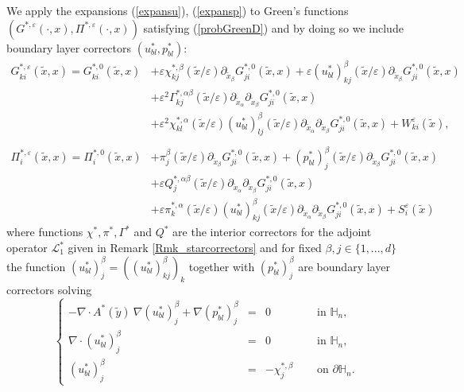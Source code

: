 \documentclass[11pt, reqno]{amsart}
\theoremstyle{definition}
\theoremstyle{remark}
\numberwithin{equation}{section}
\begin{document}
	\noindent We apply the expansions (\ref{expansu}), (\ref{expansp}) to Green's functions $(G^{*,\varepsilon}(\cdot, x),\Pi^{*,\varepsilon}(\cdot, x))$  satisfying (\ref{probGreenD}) and by doing so we include boundary layer correctors $(u_{bl}^*,p_{bl}^*):$
	\begin{align}
		G_{ki}^{*,\varepsilon} (\tilde{x},x)= G_{ki}^{*,0} (\tilde{x},x)&+ \varepsilon	\chi^{*,\beta}_{kj}(\tilde{x}/\varepsilon)\partial_{\tilde{x}_{\beta}} G_{ji}^{*,0}  (\tilde{x},x) + \varepsilon	(u_{bl}^*)^{\beta}_{kj}(\tilde{x}/\varepsilon)\partial_{\tilde{x}_{\beta}} G_{ji}^{*,0}  (\tilde{x},x)	\nonumber\\
		& + \varepsilon^2 \Gamma^{*,\alpha\beta}_{kj}(\tilde{x}/\varepsilon) \partial_{\tilde{x}_{\alpha}}\partial_{\tilde{x}_\beta} G_{ji}^{*,0}  (\tilde{x},x)\nonumber\\&+ \varepsilon^2	\chi^{*,\alpha}_{kl}(\tilde{x}/\varepsilon)(u_{bl}^*)^{\beta}_{lj}	(\tilde{x}/\varepsilon)  \partial_{\tilde{x}_{\alpha}}\partial_{\tilde{x}_\beta}G_{ji}^{*,0}  (\tilde{x},x)+	W_{ki}^{\varepsilon} (\tilde{x}),\label{expansG}	\\\nonumber\\
		\Pi_i^{*,\varepsilon} (\tilde{x},x)=  \Pi_i^{*,0} (\tilde{x},x)&+	\pi^{\beta}_{j}(\tilde{x}/\varepsilon)\partial_{\tilde{x}_\beta} G_{ji}^{*,0}   (\tilde{x},x)	 + (p_{bl}^*)^{\beta}_{j}(\tilde{x}/\varepsilon)  \partial_{\tilde{x}_\beta}G_{ji}^{*,0}  (\tilde{x},x)\nonumber\\
		&	+ \varepsilon Q^{*,\alpha\beta}_{j}(\tilde{x}/\varepsilon) \partial_{\tilde{x}_{\alpha}}\partial_{\tilde{x}_\beta}G_{ji}^{*,0}  (\tilde{x},x)\nonumber\\& +  \varepsilon	\pi^{*,\alpha}_{k}(\tilde{x}/\varepsilon)	(u^*_{bl})^{\beta}_{kj}(\tilde{x}/\varepsilon)\partial_{\tilde{x}_{\alpha}}\partial_{\tilde{x}_\beta} G_{ji}^{*,0} (\tilde{x},x)+	S_{i}^{\varepsilon} (\tilde{x})\label{expansPi}
	\end{align}	
	where functions $\chi^*, \pi^*, \Gamma^*$ and $Q^*$ are the interior correctors for the adjoint operator $\mathcal{L}_1^*$ given in Remark \ref{Rmk_starcorrectors}	and for fixed $\beta,j\in\{ 1,...,d\}$ the function  $(u^*_{bl})^{\beta}_{j}= ((u^*_{bl})^{\beta}_{kj})_k$  together with $    (p_{bl}^*)^{\beta}_{j} $ are boundary layer correctors solving 
	\begin{equation}\label{u*p*}
		\left\{
		\begin{array}{rcll}
			-\nabla\cdot A^*(\tilde{y}) \: \nabla (u^*_{bl})^{\beta}_{j}  +  \nabla(p_{bl}^*)^{\beta}_{j}  &=& 0   \quad &\mbox{ in } {\mathbb{H}}_n,\\
			\nabla\cdot(u^*_{bl})^{\beta}_{j} &=& 0  \quad  &\mbox{ in } {\mathbb{H}}_n,\\
			(u^*_{bl})^{\beta}_{j}  &=& -\chi_j^{*,\beta}\quad & \mbox{ on } \partial{\mathbb{H}}_n.
		\end{array}
		\right. 
	\end{equation}
\end{document}
